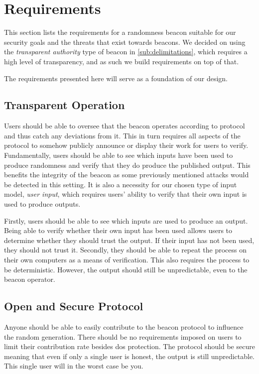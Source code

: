 \section{Requirements}%
\label{sec:beacon_requirements}
This section lists the requirements for a randomness beacon suitable for our security goals and the threats that exist towards beacons.
We decided on using the \emph{transparent authority} type of beacon in \cref{sub:delimitations}, which requires a high level of transparency, and as such we build requirements on top of that.

The requirements presented here will serve as a foundation of our design.

\subsection{Transparent Operation}\label{sec:transparent_operation}
Users should be able to oversee that the beacon operates according to protocol and thus catch any deviations from it.
This in turn requires all aspects of the protocol to somehow publicly announce or display their work for users to verify.
Fundamentally, users should be able to see which inputs have been used to produce randomness and verify that they do produce the published output.
This benefits the integrity of the beacon as some previously mentioned attacks would be detected in this setting.
It is also a necessity for our chosen type of input model, \emph{user input}, which requires users' ability to verify that their own input is used to produce outputs.

Firstly, users should be able to see which inputs are used to produce an output.
Being able to verify whether their own input has been used allows users to determine whether they should trust the output.
If their input has not been used, they should not trust it.
Secondly, they should be able to repeat the process on their own computers as a means of verification.
This also requires the process to be deterministic.
However, the output should still be unpredictable, even to the beacon operator.

\subsection{Open and Secure Protocol}\label{sec:open_and_secure_protocol}
Anyone should be able to easily contribute to the beacon protocol to influence the random generation.
There should be no requirements imposed on users to limit their contribution rate besides \gls{dos} protection.
The protocol should be secure meaning that even if only a single user is honest, the output is still unpredictable.
This single user will in the worst case be you.

